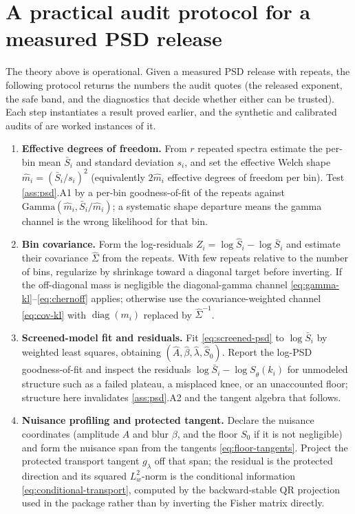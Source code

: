 \documentclass[11pt]{article}
\begin{document}
\section{A practical audit protocol for a measured PSD release}
\label{sec:protocol}

The theory above is operational. Given a measured PSD release with repeats, the following protocol returns the numbers the audit quotes (the released exponent, the safe band, and the diagnostics that decide whether either can be trusted). Each step instantiates a result proved earlier, and the synthetic and calibrated audits of  are worked instances of it.

\begin{enumerate}[label=\textbf{P\arabic*.}]
\item \textbf{Effective degrees of freedom.} From \(r\) repeated spectra estimate the per-bin mean \(\bar S_i\) and standard deviation \(s_i\), and set the effective Welch shape \(\widehat m_i=(\bar S_i/s_i)^2\) (equivalently \(2\widehat m_i\) effective degrees of freedom per bin). Test \cref{ass:psd}.A1 by a per-bin goodness-of-fit of the repeats against \(\mathrm{Gamma}(\widehat m_i,\bar S_i/\widehat m_i)\); a systematic shape departure means the gamma channel is the wrong likelihood for that bin.
\item \textbf{Bin covariance.} Form the log-residuals \(Z_i=\log\widehat S_i-\log\bar S_i\) and estimate their covariance \(\widehat\Sigma\) from the repeats. With few repeats relative to the number of bins, regularize by shrinkage toward a diagonal target \cite{ledoit2004} before inverting. If the off-diagonal mass is negligible the diagonal-gamma channel \eqref{eq:gamma-kl}--\eqref{eq:chernoff} applies; otherwise use the covariance-weighted channel \eqref{eq:cov-kl} with \(\operatorname{diag}(m_i)\) replaced by \(\widehat\Sigma^{-1}\).
\item \textbf{Screened-model fit and residuals.} Fit \eqref{eq:screened-psd} to \(\log\bar S_i\) by weighted least squares, obtaining \((\widehat A,\widehat\beta,\widehat\lambda,\widehat S_0)\). Report the log-PSD goodness-of-fit and inspect the residuals \(\log\bar S_i-\log S_{\widehat\theta}(k_i)\) for unmodeled structure such as a failed plateau, a misplaced knee, or an unaccounted floor; structure here invalidates \cref{ass:psd}.A2 and the tangent algebra that follows.
\item \textbf{Nuisance profiling and protected tangent.} Declare the nuisance coordinates (amplitude \(A\) and blur \(\beta\), and the floor \(S_0\) if it is not negligible) and form the nuisance span from the tangents \eqref{eq:floor-tangents}. Project the protected transport tangent \(g_\lambda\) off that span; the residual is the protected direction and its squared \(L^2_w\)-norm is the conditional information \eqref{eq:conditional-transport}, computed by the backward-stable QR projection used in the package rather than by inverting the Fisher matrix directly.

\end{enumerate}
\end{document}
